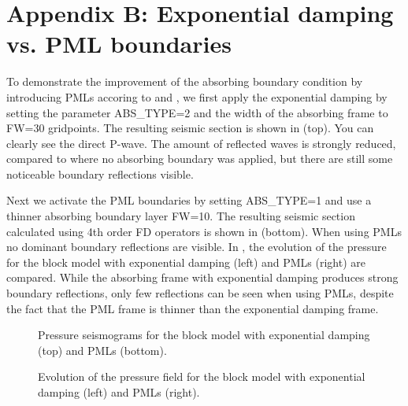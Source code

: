 \documentclass[11pt,onecolumn,oneside]{article}
\begin{document}
\section{Appendix B: Exponential damping vs. PML boundaries}\label{comp_EXP_PML} 
To demonstrate the improvement of the absorbing boundary condition by introducing PMLs accoring to \cite{komatitsch:07} and \cite{martin:09}, we first apply the exponential damping by setting the parameter ABS\_TYPE=2 and the width of
the absorbing frame to FW=30 gridpoints. The resulting seismic section is shown in  (top). You can clearly see the direct P-wave. The amount of reflected waves is strongly reduced, compared to  where no absorbing boundary was applied, but there are still some noticeable boundary reflections visible. 

Next we activate the PML boundaries by setting ABS\_TYPE=1 and use a thinner absorbing boundary layer FW=10. The resulting seismic section calculated using 4th order FD operators is shown in (bottom). When using PMLs no dominant boundary reflections are visible. In , the evolution of the pressure for the block model with exponential damping
(left) and PMLs (right) are compared. While the absorbing frame with exponential damping produces strong boundary reflections, only few reflections can be seen when using PMLs, despite
the fact that the PML frame is thinner than the exponential damping frame.            

\begin{figure}[ht]
\begin{center}
\caption{\label{ABS_cPML_comp.pdf} Pressure seismograms for the block model with exponential damping (top) and PMLs (bottom).}
\end{center}
\end{figure}
\begin{figure}[ht]
\begin{center}
\caption{\label{ABS_PML_comp_shots.pdf} Evolution of the pressure field for the block model with exponential damping (left) and PMLs (right).}
\end{center}
\end{figure}


\end{document}
